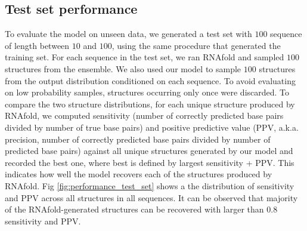 \documentclass{article}
\begin{document}
\subsection{Test set performance}

To evaluate the model on unseen data, we generated a test set with $100$ sequence of length between $10$ and $100$,
using the same procedure that generated the training set.
For each sequence in the test set, we ran RNAfold and sampled $100$ structures from the ensemble.
We also used our model to sample $100$ structures from the output distribution conditioned on each sequence.
To avoid evaluating on low probability samples, structures occurring only once were discarded.
To compare the two structure distributions,
for each unique structure produced by RNAfold, we computed sensitivity
(﻿number of correctly predicted base pairs divided by ﻿number of true base pairs) and
positive predictive value (PPV, a.k.a. precision, number of correctly predicted base pairs
divided by ﻿number of predicted base pairs)
against all unique structures generated by our model
and recorded the best one, where best is defined by largest sensitivity + PPV.
This indicates how well the model recovers each of the structures produced by RNAfold.
Fig \ref{fig:performance_test_set} shows a the distribution of sensitivity and PPV across all structures in all sequences.
It can be observed that majority of the RNAfold-generated structures can be recovered with larger than $0.8$ sensitivity and PPV.






%
%
%
\end{document}
